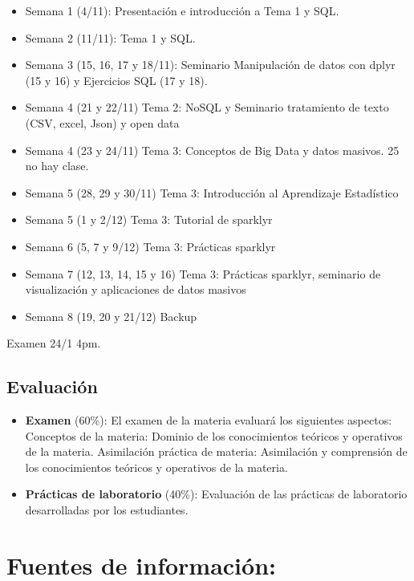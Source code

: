 \documentclass[
]{book}
\begin{document}
\begin{itemize}
\item
  Semana 1 (4/11): Presentación e introducción a Tema 1 y SQL.
\item
  Semana 2 (11/11): Tema 1 y SQL.
\item
  Semana 3 (15, 16, 17 y 18/11): Seminario Manipulación de datos con dplyr (15 y 16) y Ejercicios SQL (17 y 18).
\item
  Semana 4 (21 y 22/11) Tema 2: NoSQL y Seminario tratamiento de texto (CSV, excel, Json) y open data
\item
  Semana 4 (23 y 24/11) Tema 3: Conceptos de Big Data y datos masivos. 25 no hay clase.
\item
  Semana 5 (28, 29 y 30/11) Tema 3: Introducción al Aprendizaje Estadístico
\item
  Semana 5 (1 y 2/12) Tema 3: Tutorial de sparklyr
\item
  Semana 6 (5, 7 y 9/12) Tema 3: Prácticas sparklyr
\item
  Semana 7 (12, 13, 14, 15 y 16) Tema 3: Prácticas sparklyr, seminario de visualización y aplicaciones de datos masivos
\item
  Semana 8 (19, 20 y 21/12) Backup
\end{itemize}

Examen 24/1 4pm.

\hypertarget{evaluaciuxf3n}{%
\subsection{Evaluación}\label{evaluaciuxf3n}}

\begin{itemize}
\item
  \textbf{Examen} (60\%): El examen de la materia evaluará los siguientes aspectos:
  Conceptos de la materia: Dominio de los conocimientos teóricos y operativos de la materia.
  Asimilación práctica de materia: Asimilación y comprensión de los conocimientos teóricos y operativos de la materia.
\item
  \textbf{Prácticas de laboratorio} (40\%): Evaluación de las prácticas de laboratorio desarrolladas por los estudiantes.
\end{itemize}

\hypertarget{fuentes-de-informaciuxf3n}{%
\section{Fuentes de información:}\label{fuentes-de-informaciuxf3n}}
\end{document}
